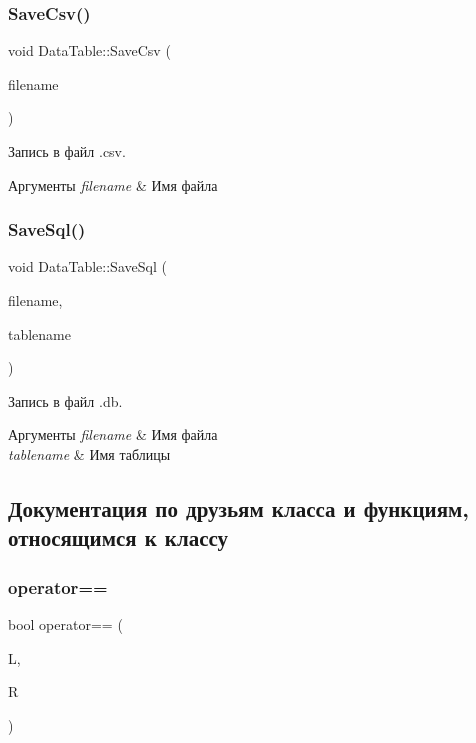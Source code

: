 \subsubsection{\texorpdfstring{Save\+Csv()}{SaveCsv()}}
{\footnotesize\ttfamily void Data\+Table\+::\+Save\+Csv (\begin{DoxyParamCaption}\item[{Q\+String}]{filename }\end{DoxyParamCaption})}



Запись в файл .csv. 


\begin{DoxyParams}{Аргументы}
{\em filename} & Имя файла \\
\hline
\end{DoxyParams}
\mbox{\label{class_data_table_a73852c3ab4dfd0fdc6ce5e99c860824f}} 
\subsubsection{\texorpdfstring{Save\+Sql()}{SaveSql()}}
{\footnotesize\ttfamily void Data\+Table\+::\+Save\+Sql (\begin{DoxyParamCaption}\item[{Q\+String}]{filename,  }\item[{Q\+String}]{tablename }\end{DoxyParamCaption})}



Запись в файл .db. 


\begin{DoxyParams}{Аргументы}
{\em filename} & Имя файла \\
\hline
{\em tablename} & Имя таблицы \\
\hline
\end{DoxyParams}


\subsection{Документация по друзьям класса и функциям, относящимся к классу}
\mbox{\label{class_data_table_a448d6b5189991394bc06db5950f2c8dc}} 
\subsubsection{\texorpdfstring{operator==}{operator==}}
{\footnotesize\ttfamily bool operator== (\begin{DoxyParamCaption}\item[{const \mbox{\hyperlink{class_data_table}{Data\+Table}} \&}]{L,  }\item[{const \mbox{\hyperlink{class_data_table}{Data\+Table}} \&}]{R }\end{DoxyParamCaption})\hspace{0.3cm}{\ttfamily [friend]}}



